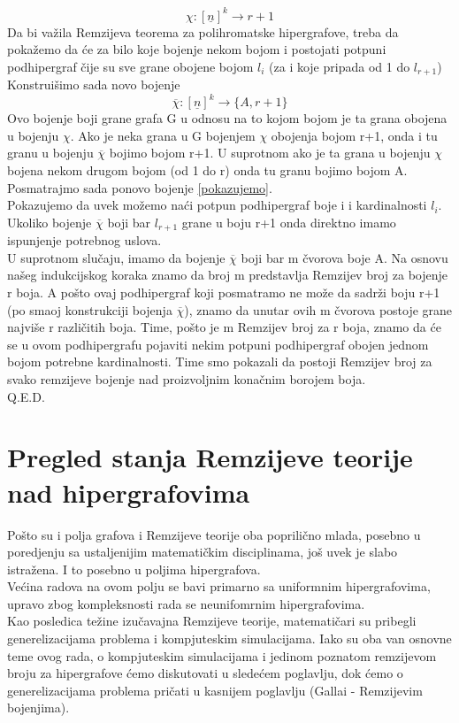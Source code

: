 \documentclass[a4paper]{article}
\begin{document}
\begin{description}
		\begin{equation}\label{pokazujemo}
		\chi : [\underline{n}]^k \rightarrow r+1
		\end{equation}
		Da bi važila Remzijeva teorema za polihromatske hipergrafove, treba da pokažemo da će za bilo koje bojenje nekom bojom i postojati potpuni podhipergraf čije su sve grane obojene bojom $l_i$ (za i koje pripada od 1 do $l_{r+1}$) %
		Konstruišimo sada novo bojenje 
		\begin{equation}
			\overline{\chi} : [\underline{n}]^k \rightarrow \{A, r+1\}
		\end{equation}
		Ovo bojenje  boji grane grafa G u odnosu na to kojom bojom je ta grana obojena u bojenju $\chi$. Ako je neka grana u G bojenjem $\chi$ obojenja bojom r+1, onda i tu granu u bojenju $\overline{\chi}$ bojimo bojom r+1. U suprotnom ako je ta grana u bojenju $\chi$ bojena nekom drugom bojom (od 1 do r) onda tu granu bojimo bojom A.\\
		Posmatrajmo sada ponovo bojenje \ref{pokazujemo}.\\
		Pokazujemo da uvek možemo naći potpun podhipergraf boje i i kardinalnosti $l_i$.
		Ukoliko bojenje $\overline{\chi}$ boji bar $l_{r+1}$ grane u boju r+1 onda direktno imamo ispunjenje potrebnog uslova.
		\\
		U suprotnom slučaju, imamo da bojenje $\overline{\chi}$ boji bar m čvorova boje A. Na osnovu našeg indukcijskog koraka znamo da broj m predstavlja Remzijev broj za bojenje r boja. A pošto ovaj podhipergraf koji posmatramo ne može da sadrži boju r+1 (po smaoj konstrukciji bojenja $\overline{\chi}$), znamo da unutar ovih m čvorova postoje grane najviše r različitih boja. Time, pošto je m Remzijev broj za r boja, znamo da će se u ovom podhipergrafu pojaviti nekim potpuni podhipergraf obojen jednom bojom potrebne kardinalnosti. Time smo pokazali da postoji Remzijev broj za svako remzijeve bojenje nad proizvoljnim konačnim borojem boja. \\
		Q.E.D.
 	\end{description}
	\section{Pregled stanja Remzijeve teorije nad hipergrafovima}
	Pošto su i polja grafova i Remzijeve teorije oba poprilično mlada, posebno u poredjenju sa ustaljenijim matematičkim disciplinama, još uvek je slabo istražena. I to posebno u poljima hipergrafova.\\ Većina radova na ovom polju se bavi primarno sa uniformnim hipergrafovima, upravo zbog kompleksnosti rada se neunifomrnim hipergrafovima.\\ Kao posledica težine izučavajna Remzijeve teorije, matematičari su pribegli generelizacijama problema i kompjuteskim simulacijama. Iako su oba van osnovne teme ovog rada, o kompjuteskim simulacijama i jedinom poznatom remzijevom broju za hipergrafove ćemo diskutovati u sledećem poglavlju, dok ćemo o generelizacijama problema pričati u kasnijem poglavlju (Gallai - Remzijevim bojenjima).
\end{document}

